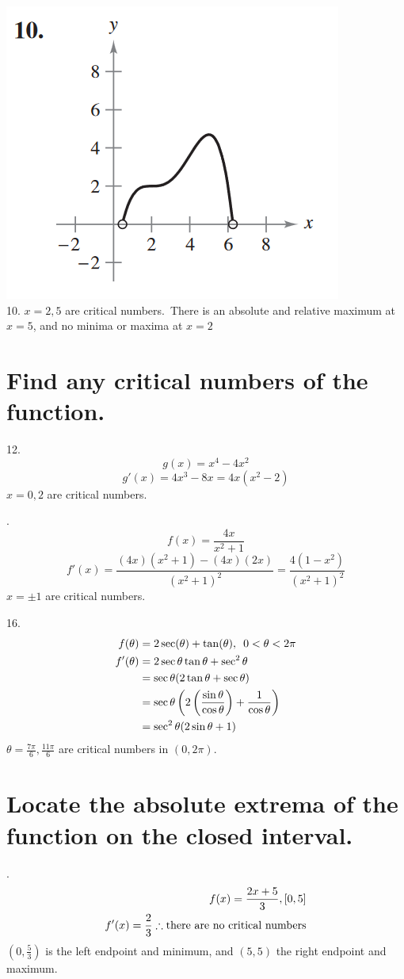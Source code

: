 \documentclass[11pt]{article}
\begin{document}
\noindent
\includegraphics{10.png}\\
10. $x=2, 5$ are critical numbers.\ There is an absolute and relative maximum at $x=5$, and no minima or maxima at $x=2$

\noindent
\section{Find any critical numbers of the function.}
12.\[g(x)=x^4-4x^2\]
\[g'(x)=4x^3-8x=4x(x^2-2)\]
$x=0, 2$ are critical numbers.

\vspace{1cm}
.\[f(x)=\frac{4x}{x^2+1}\]
\[f'(x)=\frac{(4x)(x^2+1)-(4x)(2x)}{(x^2+1)^2}=\frac{4(1-x^2)}{(x^2+1)^2}\]
$x=\pm 1$ are critical numbers.

\vspace{1cm}
16.\begin{eqnarray}
    \setcounter{equation}{1}
    f(\theta)&=2\sec(\theta)+\tan(\theta), \,\,\,0<\theta<2\pi\\
    f'(\theta)&=2\sec\theta\tan\theta+\sec^2\theta\\
    &=\sec\theta(2\tan\theta+\sec\theta)\\
    &=\sec\theta\left(2\left(\frac{\sin\theta}{\cos\theta}\right)+\frac{1}{\cos\theta}\right)\\
    &=\sec^2\theta(2\sin\theta+1)
\end{eqnarray}
$\theta=\frac{7\pi}{6}, \frac{11\pi}{6}$ are critical numbers in $(0, 2\pi)$.

\section{Locate the absolute extrema of the function on the closed interval.}
.\begin{eqnarray}
    \setcounter{equation}{1}
    f(x)=\frac{2x+5}{3}, [0, 5]\\
    f'(x)=\frac{2}{3}\therefore\text{there are no critical numbers}
\end{eqnarray}
$(0, \frac{5}{3})$ is the left endpoint and minimum, and $(5, 5)$ the right endpoint and maximum.
\end{document}
